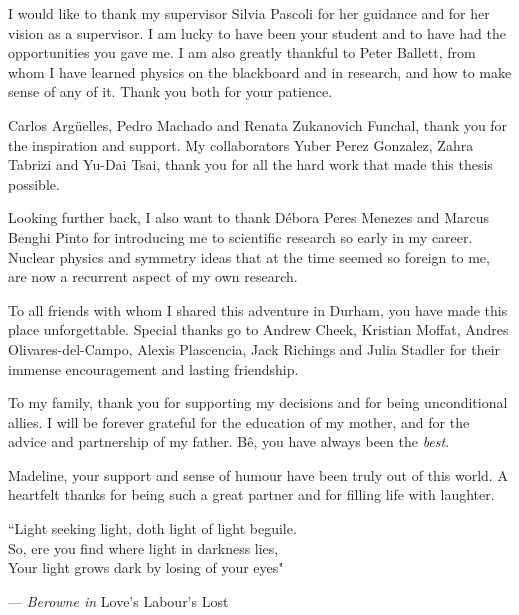 \documentclass[openany,twoside,frontopenright,openright]{ip3thesis}
\begin{document}
\begin{acknowledgements*}

	I would like to thank my supervisor Silvia Pascoli for her guidance and for her vision as a supervisor. I am lucky to have been your student and to have had the opportunities you gave me. I am also greatly thankful to Peter Ballett, from whom I have learned physics on the blackboard and in research, and how to make sense of any of it. Thank you both for your patience.
	
	\vspace{2ex}
	Carlos Arg\"uelles, Pedro Machado and Renata Zukanovich Funchal, thank you for the inspiration and support. My collaborators Yuber Perez Gonzalez, Zahra Tabrizi and Yu-Dai Tsai, thank you for all the hard work that made this thesis possible.
	
	  \vspace{2ex}
	Looking further back, I also want to thank D\'ebora Peres Menezes and Marcus Benghi Pinto for introducing me to scientific research so early in my career. Nuclear physics and symmetry ideas that at the time seemed so foreign to me, are now a recurrent aspect of my own research.
	
	\vspace{2ex}	
	To all friends with whom I shared this adventure in Durham, you have made this place unforgettable. Special thanks go to Andrew Cheek, Kristian Moffat, Andres Olivares-del-Campo, Alexis Plascencia, Jack Richings and Julia Stadler for their immense encouragement and lasting friendship.

	\vspace{2ex}
	To my family, thank you for supporting my decisions and for being unconditional allies. I will be forever grateful for the education of my mother, and for the advice and partnership of my father. B\^e, you have always been the \emph{best}.
	
	\vspace{2ex}
	Madeline, your support and sense of humour have been truly out of this world. A heartfelt thanks for being such a great partner and for filling life with laughter.
	
\end{acknowledgements*}



\cleardoublepage

\begin{epigraph*}
``Light seeking light, doth light of light beguile. \\So, ere you find where light in darkness lies, \\ Your light grows dark by losing of your eyes"

\flushright --- \emph{Berowne in} Love's Labour's Lost
\end{epigraph*} 
\end{document}
